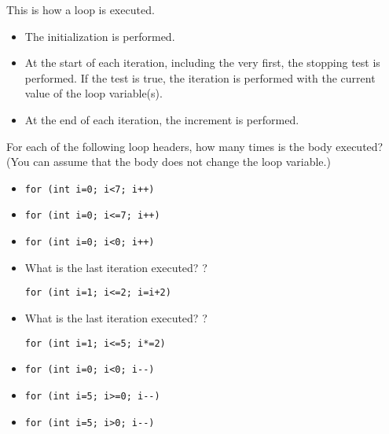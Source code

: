 This is how a loop is executed.
\begin{itemize}
\item The initialization is performed.
\item At the start of each iteration, including the very first, the
  stopping test is performed. If the test is true, the iteration is
  performed with the current value of the loop variable(s).
\item At the end of each iteration, the increment is performed.
\end{itemize}

\begin{review}
  \label{q:loop}
  For each of the following loop headers, how many times is the body
  executed? (You can assume that the body does not change the loop variable.)
  \begin{itemize}
  \item 
\begin{verbatim}
for (int i=0; i<7; i++)
\end{verbatim}
  \item 
\begin{verbatim}
for (int i=0; i<=7; i++)
\end{verbatim}
  \item 
\begin{verbatim}
for (int i=0; i<0; i++)
\end{verbatim}
  \item What is the last iteration executed? ?
\begin{verbatim}
for (int i=1; i<=2; i=i+2)
\end{verbatim}
  \item What is the last iteration executed? ?
\begin{verbatim}
for (int i=1; i<=5; i*=2)
\end{verbatim}
  \item 
\begin{verbatim}
for (int i=0; i<0; i--)
\end{verbatim}
  \item 
\begin{verbatim}
for (int i=5; i>=0; i--)
\end{verbatim}
  \item 
\begin{verbatim}
for (int i=5; i>0; i--)
\end{verbatim}
  \end{itemize}
\end{review}

